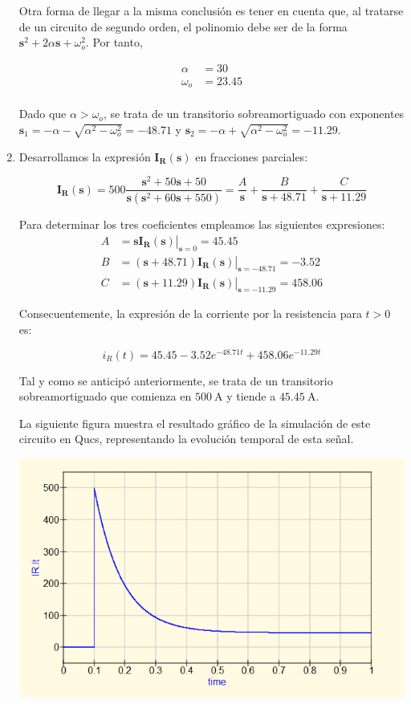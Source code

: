 \documentclass[12pt]{article}
\newcommand{\laplace}[1]{\mathbf{#1}(\mathbf{s})}
\newcommand{\slp}{\mathbf{s}}
\begin{document}
\begin{enumerate}
  Otra forma de llegar a la misma conclusión es tener en cuenta que, al tratarse de un circuito de segundo orden, el polinomio debe ser de la forma $\slp^2 + 2\alpha\slp + \omega_o^2$. Por tanto,

  \begin{align*}
    \alpha &= 30\\
    \omega_o&= 23.45\\
  \end{align*}

  Dado que $\alpha > \omega_o$, se trata de un transitorio sobreamortiguado con exponentes $\slp_1 = -\alpha - \sqrt{\alpha^2 - \omega_o^2} = -48.71$ y $\slp_2 = -\alpha + \sqrt{\alpha^2 - \omega_o^2} = -11.29$.

\item

  Desarrollamos la expresión $\laplace{I_R}$ en fracciones parciales:

  \[
    \laplace{I_R} = 500 \frac{\slp^2 + 50\slp + 50}{\slp(\slp^2 + 60\slp + 550)} = \frac{A}{\slp} + \frac{B}{\slp + 48.71} + \frac{C}{\slp+11.29}
  \]

  Para determinar los tres coeficientes empleamos las siguientes expresiones:
  \begin{align*}
    A &= \left. \slp \laplace{I_R}\right|_{\slp = 0} = 45.45\\
    B &= \left. (\slp + 48.71) \laplace{I_R}\right|_{\slp = -48.71} = -3.52\\
    C &= \left. (\slp + 11.29) \laplace{I_R}\right|_{\slp = -11.29} = 458.06
  \end{align*}

  Consecuentemente, la expresión de la corriente por la resistencia para $t > 0$ es:

  \[
    i_R(t) = 45.45 -3.52 e^{-48.71 t} + 458.06 e^{-11.29 t}    
  \]

  Tal y como se anticipó anteriormente, se trata de un transitorio sobreamortiguado que comienza en $\SI{500}{\ampere}$ y tiende a $\SI{45.45}{\ampere}$.

  La siguiente figura muestra el resultado gráfico de la simulación de este circuito en Qucs, representando la evolución temporal de esta señal.

  \includegraphics[width=\textwidth]{figs/simulaLaplace.png}

\end{enumerate}
\end{document}
